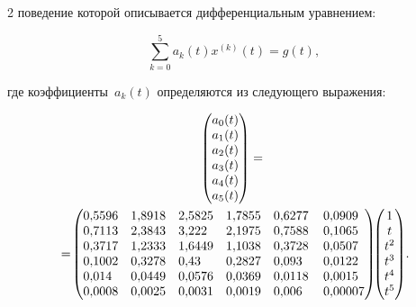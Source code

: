 \begin{multicols}{2}
поведение которой описывается дифференциальным уравнением:


$$


\sum\limits_{k=0}^5 a_k(t)x^{(k)}(t)=g(t),


$$


где коэффициенты~$a_k(t)$ определяются из сле\-ду\-юще\-го выражения:


{\small


\begin{multline*}


\begin{pmatrix}


a_0(t)\\a_1(t)\\a_2(t)\\a_3(t)\\a_4(t)\\a_5(t)\end{pmatrix}={}\\


\!\!{}=\!


\begin{pmatrix}0{,}5596&1{,}8918&2{,}5825&1{,}7855&0{,}6277&\!\!0{,}0909\\


0{,}7113&2{,}3843&3{,}222\hphantom{9}&2{,}1975&0{,}7588&\!\!0{,}1065\\


0{,}3717&1{,}2333&1{,}6449&1{,}1038&0{,}3728&\!\!0{,}0507\\


0{,}1002&0{,}3278&0{,}43\hphantom{99}&0{,}2827&0{,}093\hphantom{9}&\!\!0{,}0122\\


0{,}014\hphantom{9}&0{,}0449&0{,}0576&0{,}0369&0{,}0118&\!\!0{,}0015\\


0{,}0008&0{,}0025&0{,}0031&0{,}0019&0{,}006\hphantom{9}&\!\!\hphantom{9}0{,}00007


\end{pmatrix}\!\!


\begin{pmatrix}1\\t\\t^2\\t^3\\t^4\\t^5\end{pmatrix}\!.\hspace*{-2.77pt}


\end{multline*}


}
\end{multicols}
